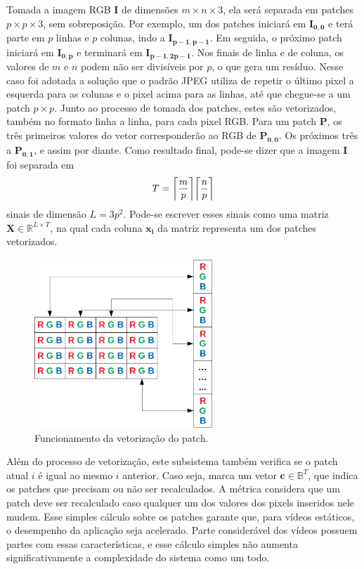 \documentclass[cic,tc]{iiufrgs}
\renewcommand{\vec}[1]{\bm{#1}}
\newcommand{\mat}[1]{\bm{#1}}
\DeclarePairedDelimiter{\ceil}{\lceil}{\rceil}
\begin{document}
Tomada a imagem RGB $\mat{I}$ de dimensões $m \times n \times 3$, ela será separada em patches
$p \times p \times 3$, sem sobreposição. Por exemplo, um dos patches iniciará em $\mat{I_{0,0}}$
e terá parte em $p$ linhas e $p$ colunas, indo a $\mat{I_{p-1, p-1}}$. Em seguida, o próximo
patch iniciará em $\mat{I_{0, p}}$ e terminará em $\mat{I_{p-1, 2p-1}}$.
Nos finais de linha e de coluna, os valores de $m$ e $n$ podem não ser divisíveis por $p$,
o que gera um resíduo. Nesse caso foi adotada a solução que o padrão JPEG utiliza de repetir
o último pixel a esquerda para as colunas e o pixel acima para as linhas, até que chegue-se
a um patch $p \times p$.
Junto ao processo de tomada dos patches, estes são vetorizados, também no formato 
linha a linha, para cada pixel RGB.
Para um patch $\mat{P}$, os três primeiros valores do vetor corresponderão ao RGB de
$\mat{P_{0,0}}$. 
Os próximos três a $\mat{P_{0,1}}$, e assim por diante.
Como resultado final, pode-se dizer que a imagem $\mat{I}$ foi separada em 
\begin{equation*}
    T = \ceil*{\frac{m}{p}} \ceil*{\frac{n}{p}}
\end{equation*}
sinais de dimensão $L = 3p^2$. Pode-se escrever esses sinais como uma matriz 
$\mat{X}\in \mathbb{R}^{L\times T}$, 
na qual cada coluna $\vec{x_i}$ da matriz representa um dos patches vetorizados.
\begin{figure}[H]
    \caption{Funcionamento da vetorização do patch.}
    \begin{center}
        \includegraphics[width=0.6\textwidth]{img/vectorize}
    \end{center}
\end{figure}

Além do processo de vetorização, este subsistema também verifica se o patch atual $i$ é 
igual ao mesmo $i$ anterior. Caso seja, marca um vetor $\vec{c}\in \mathbb{B}^T$, que indica os 
patches que precisam ou não ser recalculados.
A métrica considera que um patch deve ser recalculado caso qualquer um dos valores dos 
pixels inseridos nele mudem.
Esse simples cálculo sobre os patches garante que, para vídeos estáticos, o desempenho
da aplicação seja acelerado.
Parte considerável dos vídeos possuem partes com essas características, e esse cálculo simples
não aumenta significativamente a complexidade do sistema como um todo.
\end{document}
